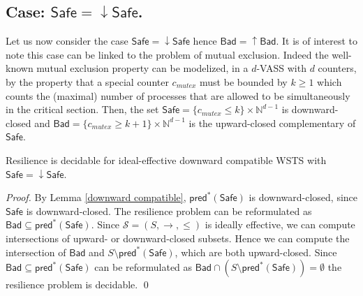 \documentclass[runningheads]{llncs}
\newcommand{\pred}{\textsf{pred}}
\newcommand{\Bad}{\textsf{Bad}}
\newcommand{\Safe}{\textsf{Safe}}
\begin{document}
%
%		




\subsection{Case: $\Safe=\downarrow \Safe$.}\label{safe-down}


Let us now consider the case $\Safe=\downarrow \Safe$ hence $\Bad=\uparrow \Bad$.
It is of interest to note this case can be linked to the problem of mutual exclusion.
Indeed the well-known mutual exclusion property can be modelized, in a $d$-VASS with $d$ counters, by the property that a special counter $c_{mutex}$ must be bounded by $k \geq 1$ which counts the (maximal) number of processes that are allowed to be simultaneously in the critical section. Then, the set $\Safe =  \{c_{mutex} \leq k\} \times \mathbb{N}^{d-1}$ is downward-closed		and $\Bad =\{c_{mutex} \geq k+1\} \times  \mathbb{N}^{d-1} $ is the upward-closed complementary of $\Safe$. 


%
\begin{theorem}\label{up-down}
{\sc Resilience}  is decidable for ideal-effective downward compatible WSTS with 
$\Safe=\downarrow \Safe$.
\end{theorem}

\begin{proof}
By Lemma \ref{downward compatible}, $\pred^*(\Safe)$ is downward-closed, since $\Safe$ is downward-closed.
The resilience problem can be reformulated as 
$\Bad \subseteq  \pred^*(\Safe)$.
Since $\mathscr{S}=(S,\rightarrow, \leq)$ is ideally effective, we can compute intersections of upward- or downward-closed 
 subsets.
Hence we can compute the intersection of
$\Bad$
and
$S \setminus \pred^*(\Safe)$,
which are both upward-closed.
Since
$\Bad \subseteq \pred^*(\Safe)$
can be reformulated as
$\Bad \cap (S \setminus \pred^*(\Safe)) = \emptyset$
the resilience problem is decidable. \qed
\end{proof}
\end{document}
